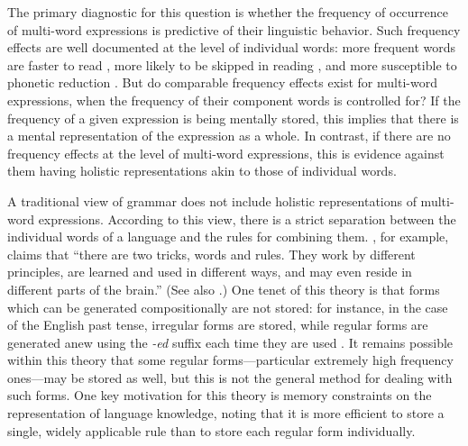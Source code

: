 \documentclass[authoryear]{elsarticle}
\begin{document}
The primary diagnostic for this question is whether the frequency of occurrence of multi-word expressions is predictive of their linguistic behavior. Such frequency effects are well documented at the level of individual words: more frequent words are faster to read \citep{Inhoff:1986vs,Rayner:1986ud,Rayner:1996wa}, more likely to be skipped in reading \citep{Rayner:1996wa,Rayner:1996vb}, and more susceptible to phonetic reduction \citep{Bybee:1999tm,Gregory:1999vs}. But do comparable frequency effects exist for multi-word expressions, when the frequency of their component words is controlled for? If the frequency of a given expression is being mentally stored, this implies that there is a mental representation of the expression as a whole. In contrast, if there are no frequency effects at the level of multi-word expressions, this is evidence against them having holistic representations akin to those of individual words.

A traditional view of grammar does not include holistic representations of multi-word expressions. According to this view, there is a strict separation between the individual words of a language and the rules for combining them. \citet{Pinker:2000wf}, for example, claims that ``there are two tricks, words and rules. They work by different principles, are learned and used in different ways, and may even reside in different parts of the brain.'' (See also  \citealp{Ullman:2001vd, Ullman:2005jf}.) One tenet of this theory is that forms which can be generated compositionally are not stored: for instance, in the case of the English past tense, irregular forms are stored, while regular forms are generated anew using the \emph{-ed} suffix each time they are used \citep{Pinker:1991vn}. It remains possible within this theory that some regular forms---particular extremely high frequency ones---may be stored as well, but this is not the general method for dealing with such forms. One key motivation for this theory is memory constraints on the representation of language knowledge, noting that it is more efficient to store a single, widely applicable rule than to store each regular form individually.
\end{document}
